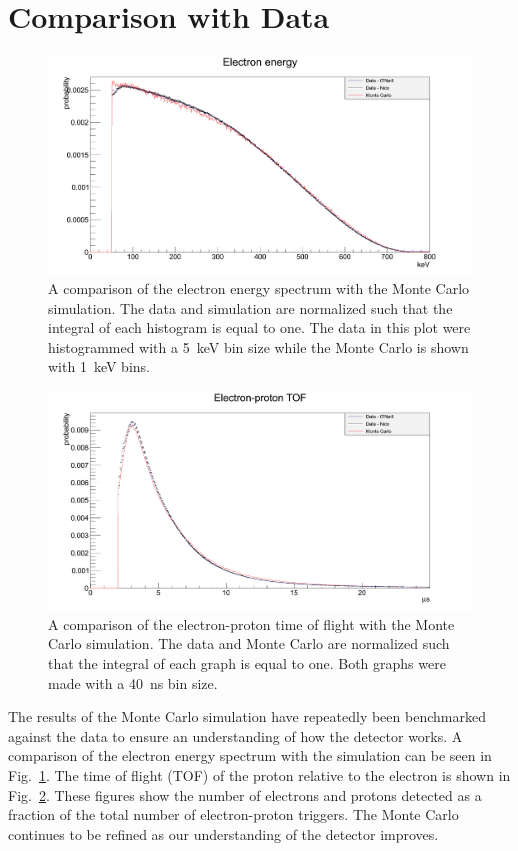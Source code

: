 \documentclass[oneside,12pt]{memoir}
\begin{document}
\section{Comparison with Data}
\label{sec:mcresults}
\begin{figure}[t]
	\includegraphics[width=\textwidth]{e_energy_comparison.png}
	\caption[Comparison of electron energy spectrum with Monte Carlo.]{A comparison of the electron energy spectrum with the Monte Carlo simulation. The data and simulation are normalized such that the integral of each histogram is equal to one. The data in this plot were histogrammed with a 5~keV bin size while the Monte Carlo is shown with 1~keV bins.}
	\label{fig:ee_vs_mc}
\end{figure}
\begin{figure}[t]
	\includegraphics[width=\textwidth]{ep_tof_comparison.png}
	\caption[Comparison of the electron-proton time of flight with the Monte Carlo.]{A comparison of the electron-proton time of flight with the Monte Carlo simulation. The data and Monte Carlo are normalized such that the integral of each graph is equal to one. Both graphs were made with a 40~ns bin size.}
	\label{fig:ep_tof_vs_mc}
\end{figure}
The results of the Monte Carlo simulation have repeatedly been benchmarked against the data to ensure an understanding of how the detector works. A comparison of the electron energy spectrum with the simulation can be seen in Fig.~\ref{fig:ee_vs_mc}. The time of flight (TOF) of the proton relative to the electron is shown in Fig.~\ref{fig:ep_tof_vs_mc}. These figures show the number of electrons and protons detected as a fraction of the total number of electron-proton triggers. The Monte Carlo continues to be refined as our understanding of the detector improves.
\end{document}
